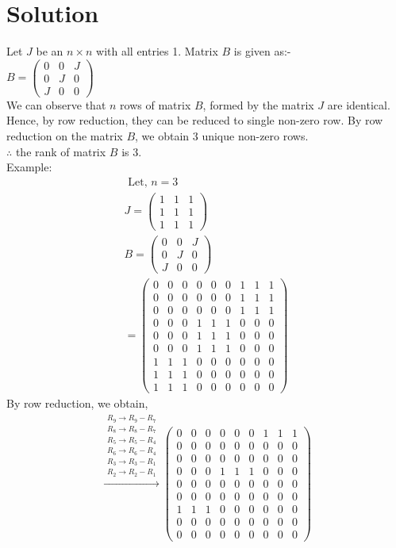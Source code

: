 \documentclass[journal,12pt,twocolumn]{IEEEtran}
\numberwithin{equation}{subsection}
\newcommand{\myvec}[1]{\ensuremath{\begin{pmatrix}#1\end{pmatrix}}}
\begin{document}
\section{Solution}
Let $J$ be an $ n \times n$ with all entries 1. Matrix $B$ is given as:-\\
$B = \myvec{0&0&J\\0&J&0\\J&0&0}$\\
We can observe that $n$ rows of matrix $B$, formed by the matrix $J$ are identical. Hence, by row reduction, they can be reduced to single non-zero  row.  By row reduction on the matrix $B$, we obtain 3 unique non-zero rows. \\
$\therefore$ the rank of matrix $B$ is 3.\\
Example: 
\begin{align}
\text{ Let, } n =3\\
J = \myvec{1&1&1\\1&1&1\\1&1&1}\\
B=\myvec{0&0&J\\0&J&0\\J&0&0}\\
=\myvec{0&0&0&0&0&0&1&1&1\\0&0&0&0&0&0&1&1&1\\0&0&0&0&0&0&1&1&1\\0&0&0&1&1&1&0&0&0\\0&0&0&1&1&1&0&0&0\\0&0&0&1&1&1&0&0&0\\1&1&1&0&0&0&0&0&0\\1&1&1&0&0&0&0&0&0\\1&1&1&0&0&0&0&0&0}
\end{align}
By row reduction, we obtain,
\begin{align}
 \xrightarrow{\substack{R_9\rightarrow R_9 - R_7\\R_8\rightarrow R_8-R_7\\R_5\rightarrow R_5 - R_4\\R_6\rightarrow R_6-R_4\\R_3\rightarrow R_3 - R_1\\R_2\rightarrow R_2-R_1}} \myvec{0&0&0&0&0&0&1&1&1\\0&0&0&0&0&0&0&0&0\\0&0&0&0&0&0&0&0&0\\0&0&0&1&1&1&0&0&0\\0&0&0&0&0&0&0&0&0\\0&0&0&0&0&0&0&0&0\\1&1&1&0&0&0&0&0&0\\0&0&0&0&0&0&0&0&0\\0&0&0&0&0&0&0&0&0}
 \end{align}
\end{document}
